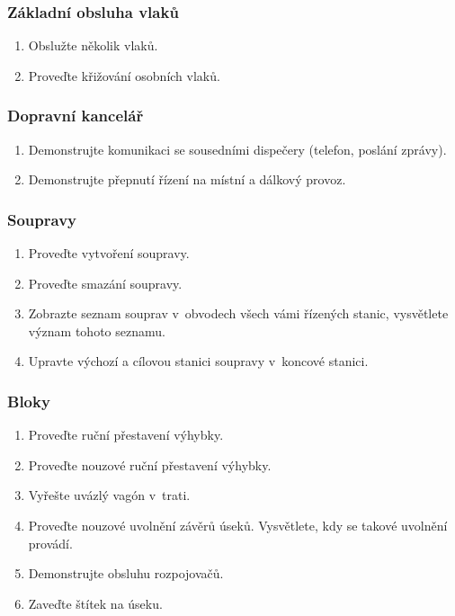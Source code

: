 \documentclass[12pt,a4paper]{article}
\begin{document}
\subsubsection*{Základní obsluha vlaků}
\begin{enumerate}[leftmargin=*]
\item Obslužte několik vlaků.
\item Proveďte křižování osobních vlaků.
\end{enumerate}

\subsubsection*{Dopravní kancelář}
\begin{enumerate}[leftmargin=*]
\item Demonstrujte komunikaci se sousedními dispečery (telefon, poslání zprávy).
\item Demonstrujte přepnutí řízení na místní a dálkový provoz.
\end{enumerate}

\subsubsection*{Soupravy}
\begin{enumerate}[leftmargin=*]
\item Proveďte vytvoření soupravy.
\item Proveďte smazání soupravy.
\item Zobrazte seznam souprav v~obvodech všech vámi řízených stanic, vysvětlete
význam tohoto seznamu.
\item Upravte výchozí a cílovou stanici soupravy v~koncové stanici.
\end{enumerate}

\subsubsection*{Bloky}
\begin{enumerate}[leftmargin=*]
\item Proveďte ruční přestavení výhybky.
\item Proveďte nouzové ruční přestavení výhybky.
\item Vyřešte uvázlý vagón v~trati.
\item Proveďte nouzové uvolnění závěrů úseků. Vysvětlete, kdy se takové uvolnění
provádí.
\item Demonstrujte obsluhu rozpojovačů.
\item Zaveďte štítek na úseku.
\end{enumerate}
\end{document}
